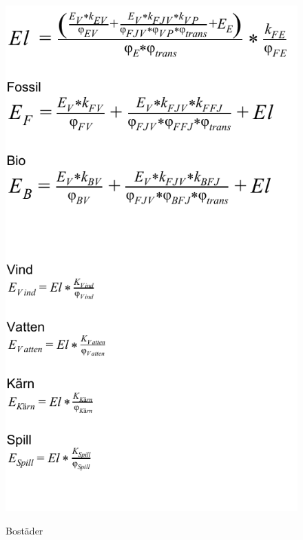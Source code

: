 \documentclass[a4paper,11pt,fleqn, titlepage]{article}
\begin{document}
\begin{figure}[!h]
	\centering 
 		\includegraphics[scale = 0.75]{homes2.pdf}
		\label{diagram3}
		\caption{Bostäder}
\end{figure}
\newpage
\end{document}
